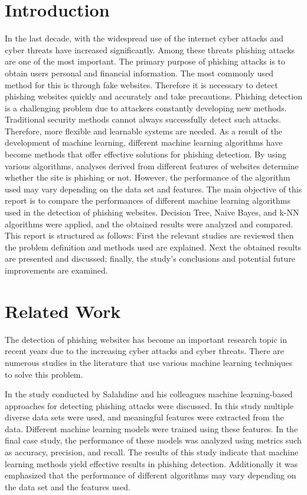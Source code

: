 \documentclass[conference]{IEEEtran}
\begin{document}
	\section{Introduction}
	\label{sec:introduction}
	
   In the last decade, with the widespread use of the internet cyber attacks and cyber threats have increased significantly. Among these threats phishing attacks are one of the most important. The primary purpose of phishing attacks is to obtain users personal and financial information. The most commonly used method for this is through fake websites. Therefore it is necessary to detect phishing websites quickly and accurately and take precautions. Phishing detection is a challenging problem due to attackers constantly developing new methods. Traditional security methods cannot always successfully detect such attacks. Therefore, more flexible and learnable systems are needed. 
     As a result of the development of machine learning, different machine learning algorithms have become methods that offer effective solutions for phishing detection. By using various algorithms, analyses derived from different features of websites determine whether the site is phishing or not. However, the performance of the algorithm used may vary depending on the data set and features.
    The main objective of this report is to compare the performances of different machine learning algorithms used in the detection of phishing websites. Decision Tree, Naive Bayes, and k-NN algorithms were applied, and the obtained results were analyzed and compared. This report is structured as follows: First the relevant studies are reviewed then the problem definition and methods used are explained. Next the obtained results are presented and discussed; finally, the study's conclusions and potential future improvements are examined. 
	
	\section{Related Work}
	\label{sec:related_work}
	
The detection of phishing websites has become an important research topic in recent years due to the increasing cyber attacks and cyber threats. There are numerous studies in the literature that use various machine learning techniques to solve this problem.

    In the study conducted by Salahdine and his colleagues machine learning-based approaches for detecting phishing attacks were discussed. In this study multiple diverse data sets were used, and meaningful features were extracted from the data. Different machine learning models were trained using these features. In the final case study, the performance of these models was analyzed using metrics such as accuracy, precision, and recall.  The results of this study indicate that machine learning methods yield effective results in phishing detection.  Additionally it was emphasized that the performance of different algorithms may vary depending on the data set and the features used.\cite{b3}
\end{document}
